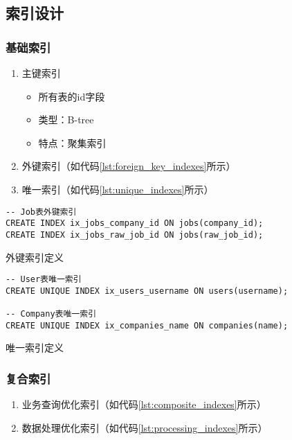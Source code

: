 \subsection{索引设计}

\subsubsection{基础索引}

\begin{enumerate}
  \item 主键索引
  \begin{itemize}
    \item 所有表的id字段
    \item 类型：B-tree
    \item 特点：聚集索引
  \end{itemize}

  \item 外键索引（如代码\ref{lst:foreign_key_indexes}所示）
  \item 唯一索引（如代码\ref{lst:unique_indexes}所示）
\end{enumerate}

\begin{listing}[htbp]
  \begin{verbatim}
-- Job表外键索引
CREATE INDEX ix_jobs_company_id ON jobs(company_id);
CREATE INDEX ix_jobs_raw_job_id ON jobs(raw_job_id);
  \end{verbatim}
  \caption{外键索引定义}\label{lst:foreign_key_indexes}
\end{listing}

\begin{listing}[htbp]
  \begin{verbatim}
-- User表唯一索引
CREATE UNIQUE INDEX ix_users_username ON users(username);

-- Company表唯一索引
CREATE UNIQUE INDEX ix_companies_name ON companies(name);
  \end{verbatim}
  \caption{唯一索引定义}\label{lst:unique_indexes}
\end{listing}

\subsubsection{复合索引}

\begin{enumerate}
  \item 业务查询优化索引（如代码\ref{lst:composite_indexes}所示）
  \item 数据处理优化索引（如代码\ref{lst:processing_indexes}所示）
\end{enumerate}

